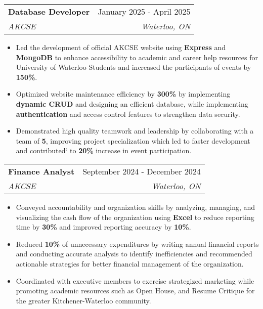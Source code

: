 \documentclass[letterpaper,11pt]{article}
\makeatletter
\newcommand{\resumeItem}[1]{
  \item\small{
    {#1 \vspace{-2pt}}
  }
}
\newcommand{\resumeSubheading}[4]{
  \vspace{-2pt}\item
    \begin{tabular*}{0.97\textwidth}[t]{l@{\extracolsep{\fill}}r}
      \textbf{#1} & #2 \\
      \textit{\small#3} & \textit{\small #4} \\
    \end{tabular*}\vspace{-7pt}
}
\newcommand{\resumeItemListStart}{\begin{itemize}}
\newcommand{\resumeItemListEnd}{\end{itemize}\vspace{-5pt}}
\makeatother
\begin{document}
    \resumeSubheading
      {Database Developer}{January 2025 - April 2025}
      {AKCSE}
      {Waterloo, ON}
      \resumeItemListStart
        \resumeItem{Led the development of official AKCSE website using \textbf{Express} and \textbf{MongoDB} to enhance accessibility to academic and career help resources for University of Waterloo Students and increased the participants of events by \textbf{150\%}.}
        \resumeItem{Optimized website maintenance efficiency by \textbf{300\%} by implementing \textbf{dynamic CRUD} and designing an efficient database, while implementing \textbf{authentication} and access control features to strengthen data security.}
        \resumeItem{Demonstrated high quality teamwork and leadership by collaborating with a team of \textbf{5}, improving project specialization which led to faster development and contributed` to \textbf{20\%} increase in event participation.}
      \resumeItemListEnd
      
      \resumeSubheading
      {Finance Analyst}{September 2024 - December 2024}
      {AKCSE}
      {Waterloo, ON}
      \resumeItemListStart
        \resumeItem{Conveyed accountability and organization skills by analyzing, managing, and visualizing the cash flow of the organization using \textbf{Excel} to reduce reporting time by \textbf{30\%} and improved reporting accuracy by \textbf{10\%}.}
        \resumeItem{Reduced \textbf{10\%} of unnecessary expenditures by writing annual financial reports and conducting accurate analysis to identify inefficiencies and recommended actionable strategies for better financial management of the organization.}
        \resumeItem{Coordinated with executive members to exercise strategized marketing while promoting academic resources such as Open House, and Resume Critique for the greater Kitchener-Waterloo community.} 
      \resumeItemListEnd
    
\end{document}
